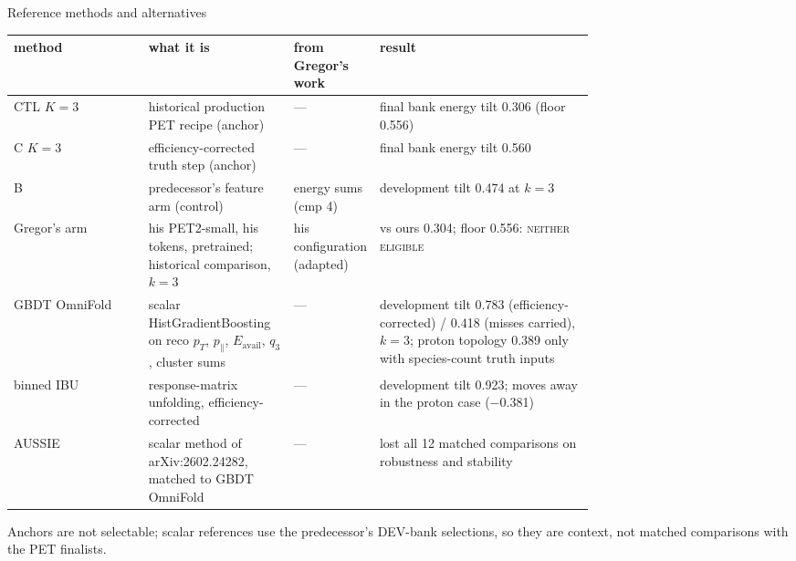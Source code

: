 \documentclass[aspectratio=169,10pt]{beamer}
\def\evidencetext{}
\begin{document}
\gdef\evidencetext{\texttt{results/final/population\_look1.json}; \texttt{dev/SCREENS-20260927-3d.json}; \texttt{scalar/results/SCALAR\_AUSSIE\_MATCHED-20260925.json}; \texttt{../configuration\_comparison/campaign\_report.json}; \texttt{scalar/SCALAR\_AUSSIE\_MATCHED-20260925.md}}
\begin{frame}{Reference methods and alternatives}
{\scriptsize
\begin{tabular}{l>{\raggedright\arraybackslash}p{0.25\linewidth}>{\raggedright\arraybackslash}p{0.12\linewidth}>{\raggedright\arraybackslash}p{0.37\linewidth}}
\toprule
method & what it is & from Gregor's work & result \\
\midrule
CTL $K{=}3$ & historical production PET recipe (anchor) & --- & final bank energy tilt 0.306 (floor 0.556) \\
C $K{=}3$ & efficiency-corrected truth step (anchor) & --- & final bank energy tilt 0.560 \\
B & predecessor's feature arm (control) & energy sums (cmp 4) & development tilt 0.474 at $k{=}3$ \\
Gregor's arm & his PET2-small, his tokens, pretrained; historical comparison, $k{=}3$ & his configuration (adapted) & 0.417 vs ours 0.304; floor 0.556: \textsc{neither eligible} \\
GBDT OmniFold & scalar HistGradientBoosting on reco $p_T$, $p_\parallel$, $E_\mathrm{avail}$, $q_3$, cluster sums & --- & development tilt 0.783 (efficiency-corrected) / 0.418 (misses carried), $k{=}3$; proton topology 0.389 only with species-count truth inputs \\
binned IBU & response-matrix unfolding, efficiency-corrected & --- & development tilt 0.923; moves away in the proton case (\ensuremath{-}0.381) \\
AUSSIE & scalar method of arXiv:2602.24282, matched to GBDT OmniFold & --- & lost all 12 matched comparisons on robustness and stability \\
\bottomrule
\end{tabular}}\par\vspace{0.1cm}\tiny Anchors are not selectable; scalar references use the predecessor's DEV-bank selections, so they are context, not matched comparisons with the PET finalists.
\end{frame}
\end{document}
